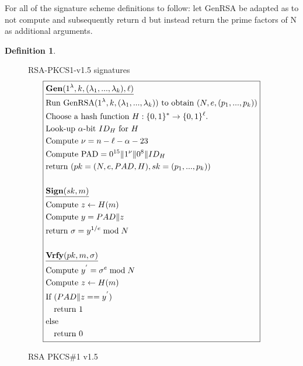 \documentclass[]{final_report}
\theoremstyle{definition}
\newtheorem{definition}{Definition}[chapter]
\begin{document}
For all of the signature scheme definitions to follow: let GenRSA be adapted as to not compute and subsequently return d but instead return the prime factors of N as additional arguments.
\begin{definition}
\begin{figure}[H]
\centering
\hfill RSA-PKCS1-v1.5 signatures\hfill\phantom{} 
\[
\boxed{
\begin{aligned}
&\underline{\textbf{\text{Gen}} (1^\lambda, k, (\lambda_{1},...,\lambda_{k}), \ell)} \\
&\text{Run GenRSA}(1^\lambda, k, (\lambda_{1},...,\lambda_{k})) \text{ to obtain } (N, e, (p_{1},...,p_{k})) \\
&\text{Choose a hash function } H : \{0, 1\}^* \rightarrow \{0, 1\}^\ell. \\
&\text{Look-up } \alpha\text{-bit } ID_{H} \text{ for } H \\
&\text{Compute } \nu = n - \ell - \alpha - 23 \\
&\text{Compute PAD} = 0^{15} \| 1^{\nu} \| 0^8 \| ID_{H} \\
&\text{return } (pk = (N, e, PAD, H), sk =  (p_{1},...,p_{k})) \\
\\
&\underline{\textbf{\text{Sign}} (sk, m)} \\
&\text{Compute } z \leftarrow H(m) \\
&\text{Compute } y = PAD  \| z \\
&\text{return } \sigma = y^{1/e} \bmod N \\
\\
&\underline{\textbf{\text{Vrfy}} (pk, m, \sigma)} \\
&\text{Compute } y^{'} = \sigma^{e} \bmod N \\
&\text{Compute } z \leftarrow H(m) \\
&\text{If } (PAD \| z == y^{'}) \\
&\quad \text{return } 1 \\
&\text{else} \\
&\quad \text{return } 0 
\end{aligned}
}
\]
\caption{RSA PKCS\#1 v1.5}
\label{fig:pkcs}
\end{figure}
\end{definition}
\end{document}
